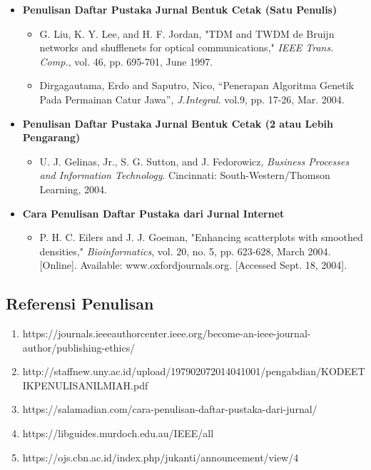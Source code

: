 \documentclass{article}
\begin{document}
\begin{itemize}
    \item \textbf{Penulisan Daftar Pustaka Jurnal Bentuk Cetak (Satu Penulis)}
    \begin{itemize}
        \item G. Liu, K. Y. Lee, and H. F. Jordan, "TDM and TWDM de Bruijn networks and shufflenets for optical communications," \emph{IEEE Trans. Comp.}, vol. 46, pp. 695-701, June 1997.
        \item Dirgagautama, Erdo and Saputro, Nico, “Penerapan Algoritma Genetik Pada Permainan Catur Jawa”, \emph{J.Integral}. vol.9, pp. 17-26, Mar. 2004.
    \end{itemize}
    \item \textbf{Penulisan Daftar Pustaka Jurnal Bentuk Cetak (2 atau Lebih Pengarang)}
    \begin{itemize}
        \item U. J. Gelinas, Jr., S. G. Sutton, and J. Fedorowicz, \emph{Business Processes and Information Technology}. Cincinnati: South-Western/Thomson Learning, 2004.
    \end{itemize}
    \item \textbf{Cara Penulisan Daftar Pustaka dari Jurnal Internet}
    \begin{itemize}
        \item P. H. C. Eilers and J. J. Goeman, "Enhancing scatterplots with smoothed densities," \emph{Bioinformatics}, vol. 20, no. 5, pp. 623-628, March 2004. [Online]. Available: www.oxfordjournals.org. [Accessed Sept. 18, 2004].
    \end{itemize}
\end{itemize}

\subsection{Referensi Penulisan}

\begin{enumerate}
    \item https://journals.ieeeauthorcenter.ieee.org/become-an-ieee-journal-author/publishing-ethics/
    \item http://staffnew.uny.ac.id/upload/197902072014041001/pengabdian/KODEETIKPENULISANILMIAH.pdf
    \item https://salamadian.com/cara-penulisan-daftar-pustaka-dari-jurnal/
    \item https://libguides.murdoch.edu.au/IEEE/all
    \item https://ojs.cbn.ac.id/index.php/jukanti/announcement/view/4
\end{enumerate}
\end{document}
